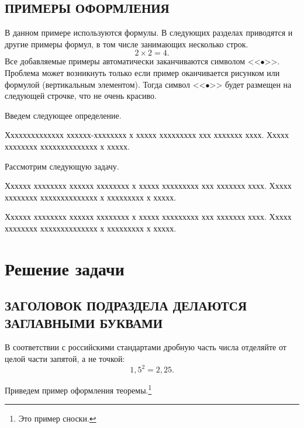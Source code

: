 \documentclass[11pt]{ubs}
\begin{document}
\subsection{\MakeUppercase{Примеры оформления}}
\begin{example}
В данном примере используются формулы. В следующих разделах приводятся и другие
примеры формул, в том числе занимающих несколько строк.
\begin{equation}
    2\times 2=4.
\end{equation}
Все добавляемые примеры автоматически заканчиваются символом
<<$\bullet$>>. Проблема может возникнуть только если пример
оканчивается рисунком или формулой (вертикальным элементом). Тогда
символ <<$\bullet$>> будет размещен на следующей строчке, что не
очень красиво.
\end{example}

Введем следующее определение.

\begin{definition}
Хххххххххххххх хххххх-хххххххх х ххххх ххххххххх ххх ххххххх хххх.
Ххххх хххххххх хххххххххххххх х ххххх.
\end{definition}

Рассмотрим следующую задачу.

\begin{problem} \label{prob:1}
Хххххх хххххххх хххххх хххххххх х ххххх ххххххххх ххх ххххххх хххх.
Ххххх хххххххх хххххххххххххх х ххххххххх х ххххх.
\end{problem}

Хххххх хххххххх хххххх хххххххх х ххххх ххххххххх ххх ххххххх хххх.
Ххххх хххххххх хххххххххххххх х ххххххххх х ххххх.


\section{Решение задачи}
\subsection{\MakeUppercase{Заголовок подраздела делаются заглавными буквами}}

В соответствии с российскими стандартами дробную часть числа отделяйте от целой части запятой, а не точкой:
\begin{equation}
1{,}5^2=2{,}25. \nonumber
\end{equation}

Приведем пример оформления теоремы.\footnote{Это пример сноски.}
\end{document}
